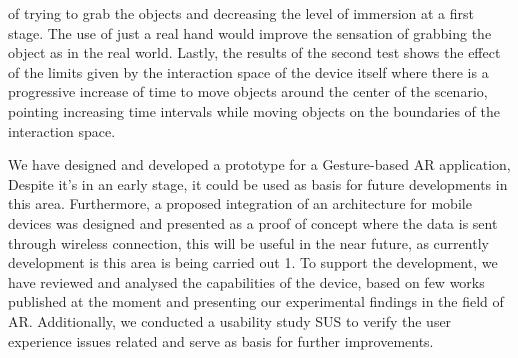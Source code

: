 of trying to grab the objects and decreasing the level of immersion at a first stage. The use of just a real hand would improve the sensation of grabbing the object as in the real world. Lastly, the results of the second test shows the effect of the limits given by the interaction space of the device itself where there is a progressive increase of time to move objects around the center of the scenario, pointing increasing time intervals while moving objects on the boundaries of the interaction space.





We have designed and developed a prototype for a Gesture-based AR application, Despite it’s in an early stage, it could be used as basis for future developments in this area. Furthermore, a proposed integration of an architecture for mobile devices was designed and presented as a proof of concept where the data is sent through wireless connection, this will be useful in the near future, as currently development is this area is being carried out 1. To support the development, we have reviewed and analysed the capabilities of the device, based on few works published at the moment and presenting our experimental findings in the field of AR. Additionally, we conducted a usability study SUS to verify the user experience issues related and serve as basis for further improvements.

